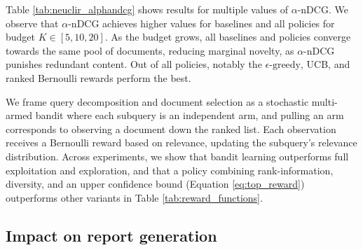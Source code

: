 


Table \ref{tab:neuclir_alphandcg} shows results for multiple values of \(\alpha\text{-nDCG}\). We observe that \(\alpha\text{-nDCG}\) achieves higher values for baselines and all policies for budget \(K \in [5, 10, 20]\). As the budget grows, all baselines and policies converge towards the same pool of documents, reducing marginal novelty, as \(\alpha\text{-nDCG}\) punishes redundant content. Out of all policies, notably the \(\epsilon\text{-greedy}\), UCB, and ranked Bernoulli rewards perform the best. %

We frame query decomposition and document selection as a stochastic multi-armed bandit where each subquery is an independent arm, and pulling an arm corresponds to observing a document down the ranked list. Each observation receives a Bernoulli reward based on relevance, updating the subquery’s relevance distribution. Across experiments, we show that bandit learning outperforms full exploitation and exploration, and that a policy combining rank-information, diversity, and an upper confidence bound (Equation \ref{eq:top_reward}) outperforms other variants in Table \ref{tab:reward_functions}.




\subsection{Impact on report generation}\label{section:neuclir_downstream_task}

